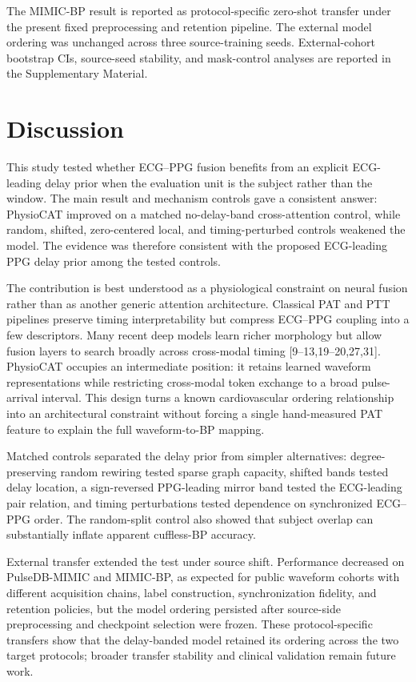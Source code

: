 \documentclass[preprint,12pt]{elsarticle}
\begin{document}
The MIMIC-BP result is reported as protocol-specific zero-shot transfer under the present fixed preprocessing and retention pipeline. The external model ordering was unchanged across three source-training seeds. External-cohort bootstrap CIs, source-seed stability, and mask-control analyses are reported in the Supplementary Material.
\FloatBarrier
\section{Discussion}

This study tested whether ECG--PPG fusion benefits from an explicit ECG-leading delay prior when the evaluation unit is the subject rather than the window. The main result and mechanism controls gave a consistent answer: PhysioCAT improved on a matched no-delay-band cross-attention control, while random, shifted, zero-centered local, and timing-perturbed controls weakened the model. The evidence was therefore consistent with the proposed ECG-leading PPG delay prior among the tested controls.

The contribution is best understood as a physiological constraint on neural fusion rather than as another generic attention architecture. Classical PAT and PTT pipelines preserve timing interpretability but compress ECG--PPG coupling into a few descriptors. Many recent deep models learn richer morphology but allow fusion layers to search broadly across cross-modal timing [9--13,19--20,27,31]. PhysioCAT occupies an intermediate position: it retains learned waveform representations while restricting cross-modal token exchange to a broad pulse-arrival interval. This design turns a known cardiovascular ordering relationship into an architectural constraint without forcing a single hand-measured PAT feature to explain the full waveform-to-BP mapping.

Matched controls separated the delay prior from simpler alternatives: degree-preserving random rewiring tested sparse graph capacity, shifted bands tested delay location, a sign-reversed PPG-leading mirror band tested the ECG-leading pair relation, and timing perturbations tested dependence on synchronized ECG--PPG order. The random-split control also showed that subject overlap can substantially inflate apparent cuffless-BP accuracy.

External transfer extended the test under source shift. Performance decreased on PulseDB-MIMIC and MIMIC-BP, as expected for public waveform cohorts with different acquisition chains, label construction, synchronization fidelity, and retention policies, but the model ordering persisted after source-side preprocessing and checkpoint selection were frozen. These protocol-specific transfers show that the delay-banded model retained its ordering across the two target protocols; broader transfer stability and clinical validation remain future work.
\end{document}
